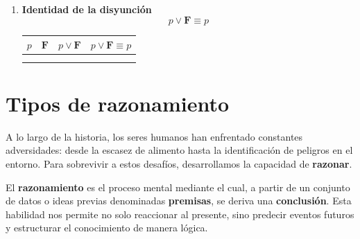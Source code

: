 \begin{enumerate}[label=\alph*)]
\begin{center}
	\renewcommand{\arraystretch}{1.4}
	\begin{tabular}{|c|c|c||c|}
		\hline
		$p$ & $\mathbf{V}$ & $p \land \mathbf{V}$ & $p \land \mathbf{V} \equiv p$ \\
		\hline
		\V & \V & \V & \V \\
		\hline
		\F & \V & \F & \V \\
		\hline
	\end{tabular}
\end{center}

\item \textbf{Identidad de la disyunción}
\[p \vee \mathbf{F} \equiv p\]

\begin{center}
	\renewcommand{\arraystretch}{1.4}
	\begin{tabular}{|c|c|c||c|}
		\hline
		$p$ & $\mathbf{F}$ & $p \vee \mathbf{F}$ & $p \vee \mathbf{F} \equiv p$ \\
		\hline
		\V & \F & \V & \V \\
		\hline
		\F & \F & \F & \V \\
		\hline
	\end{tabular}
\end{center}

\end{enumerate}




\section{Tipos de razonamiento}

A lo largo de la historia, los seres humanos han enfrentado constantes adversidades: desde la escasez de alimento hasta la identificación de peligros en el entorno. Para sobrevivir a estos desafíos, desarrollamos la capacidad de \textbf{razonar}.

El \textbf{razonamiento} es el proceso mental mediante el cual, a partir de un conjunto de datos o ideas previas denominadas \textbf{premisas}, se deriva una \textbf{conclusión}. Esta habilidad nos permite no solo reaccionar al presente, sino predecir eventos futuros y estructurar el conocimiento de manera lógica.

